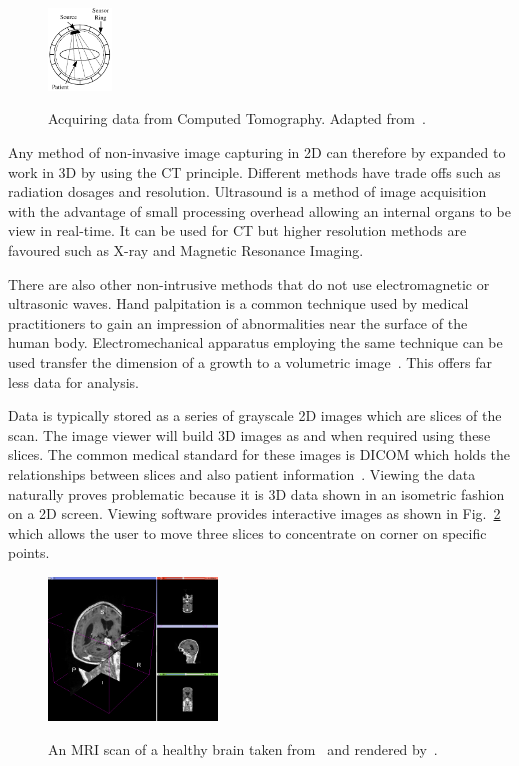 \documentclass[journal]{IEEEtran}
\begin{document}
\begin{figure}[!htb]
   \centering
   \includegraphics[width = 0.15\textwidth]{Figures/CT.pdf}
   \label{fig:ct}
   \caption{Acquiring data from Computed Tomography. Adapted from~\cite{kayvan2006biomedical}.}
\end{figure}

Any method of non-invasive image capturing in 2D can therefore by expanded to work in 3D by using the CT principle.
Different methods have trade offs such as radiation dosages and resolution.
Ultrasound is a method of image acquisition with the advantage of small processing overhead allowing an internal organs to be view in real-time. 
It can be used for CT but higher resolution methods are favoured such as X-ray and Magnetic Resonance Imaging.

There are also other non-intrusive methods that do not use electromagnetic or ultrasonic waves.
Hand palpitation is a common technique used by medical practitioners to gain an impression of abnormalities near the surface of the human body. 
Electromechanical apparatus employing the same technique can be used transfer the dimension of a growth to a volumetric image~\cite{liu09haptic,wellman1997modeling}.  
This offers far less data for analysis.

Data is typically stored as a series of grayscale 2D images which are slices of the scan.
The image viewer will build 3D images as and when required using these slices.
The common medical standard for these images is DICOM which holds the relationships between slices and also patient information~\cite{dicom11nema}.
Viewing the data naturally proves problematic because it is 3D data shown in an isometric fashion on a 2D screen.
Viewing software provides interactive images as shown in Fig.~\ref{fig:3d} which allows the user to move three slices to concentrate on corner on specific points.

\begin{figure}[!htb]
   \centering
   \includegraphics[width = 0.4\textwidth]{Figures/3Dview.png}
   \label{fig:3d}
   \caption{An MRI scan of a healthy brain taken from~\cite{cia} and rendered by~\cite{slicer}.}
\end{figure}
\end{document}
